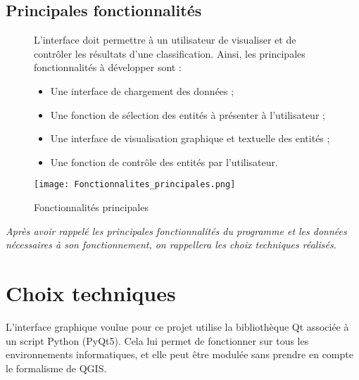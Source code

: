 \subsection{Principales fonctionnalités}

\begin{figure}[!h]
	\begin{minipage}{0.50\linewidth}\parindent12pt
		 \indent L'interface doit permettre à un utilisateur de visualiser et de contrôler les résultats d'une classification. Ainsi, les principales fonctionnalités à développer sont :\\
		\begin{itemize}[label=$\rightarrow$]
			\item Une interface de chargement des données ;
			\item Une fonction de sélection des entités à présenter à l'utilisateur ;
			\item Une interface de visualisation graphique et textuelle des entités ;
			\item Une fonction de contrôle des entités par l'utilisateur.
		\end{itemize}
	\end{minipage}
\hfill
	\begin{minipage}{0.45\linewidth}
		\centering
		\texttt{[image: Fonctionnalites\_principales.png]}  \\
		\caption[Fonctionnalités principales]{Fonctionnalités principales}
		\label{fig:fonctionnalitesprinc}
	\end{minipage}
\end{figure}

\textit{Après avoir rappelé les principales fonctionnalités du programme et les données nécessaires à son fonctionnement, on rappellera les choix techniques réalisés.}

\section{Choix techniques}

L’interface graphique voulue pour ce projet utilise la bibliothèque Qt associée à un script Python (PyQt5). Cela lui permet de fonctionner sur tous les environnements informatiques, et elle peut être modulée sans prendre en compte le formalisme de QGIS.
